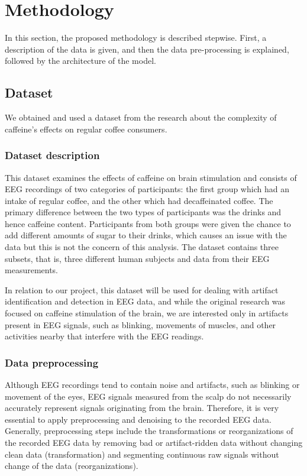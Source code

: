 \documentclass[12pt,a4paper,titlepage,openany]{report}
\begin{document}


\chapter{Methodology}
\thispagestyle{fancy}

In this section, the proposed methodology is described stepwise. First, a description of the data is given, and then the data pre-processing is explained, followed by the architecture of the model.

\section{Dataset}

We obtained and used a dataset from the research about the complexity of caffeine's effects on regular coffee consumers\cite{lesar2025}.

\subsection{Dataset description}

This dataset examines the effects of caffeine on brain stimulation and consists of EEG recordings of two categories of participants: the first group which had an intake of regular coffee, and the other which had decaffeinated coffee. 
The primary difference between the two types of participants was the drinks and hence caffeine content. 
Participants from both groups were given the chance to add different amounts of sugar to their drinks, which causes an issue with the data but this is not the concern of this analysis.
The dataset contains three subsets, that is, three different human subjects and data from their EEG measurements.

In relation to our project, this dataset will be used for dealing with artifact identification and detection in EEG data, and while the original research was focused on caffeine stimulation of the brain, we are interested only in artifacts present in EEG signals, such as blinking, movements of muscles, and other activities nearby that interfere with the EEG readings.

\subsection{Data preprocessing}

Although EEG recordings tend to contain noise and artifacts, such as blinking or movement of the eyes, EEG signals measured from the scalp do not necessarily accurately represent signals originating from the brain. 
Therefore, it is very essential to apply preprocessing and denoising to the recorded EEG data. 
Generally, preprocessing steps include the transformations or reorganizations of the recorded EEG data by removing bad or artifact-ridden data without changing clean data (transformation) and segmenting continuous raw signals without change of the data (reorganizations).
\end{document}
